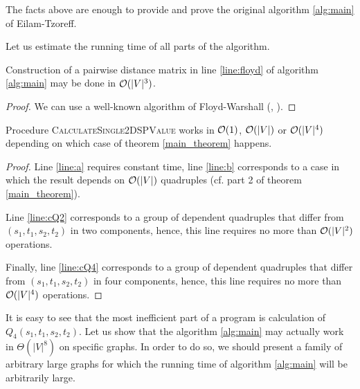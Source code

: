 The facts above are enough to provide and prove the original algorithm \ref{alg:main} of Eilam-Tzoreff.

Let us estimate the running time of all parts of the algorithm.

\begin{proposition}
Construction of a pairwise distance matrix in line \ref{line:floyd} of algorithm \ref{alg:main} may be done in $\mathcal{O}(|V|^3)$.
\end{proposition}
\begin{proof}
We can use a well-known algorithm of Floyd-Warshall (\cite{Floyd}, \cite{CLRS}).
\end{proof}

\begin{proposition}
Procedure \textsc{CalculateSingle2DSPValue} works in $\mathcal{O}(1)$, $\mathcal{O}(|V|)$ or $\mathcal{O}(|V|^4)$ depending on which case of theorem \ref{main_theorem} happens.
\end{proposition}
\begin{proof}
Line \ref{line:a} requires constant time, line \ref{line:b} corresponds to a case in which the result depends on $\mathcal{O}(|V|)$ quadruples (cf. part 2 of theorem \ref{main_theorem}). 

Line \ref{line:cQ2} corresponds to a group of dependent quadruples that differ from $(s_1, t_1, s_2, t_2)$ in two components, hence, this line requires no more than $\mathcal{O}(|V|^2)$ operations.

Finally, line \ref{line:cQ4} corresponds to a group of dependent quadruples that differ from $(s_1, t_1, s_2, t_2)$ in four components, hence, this line requires no more than $\mathcal{O}(|V|^4)$ operations. \end{proof}

It is easy to see that the most inefficient part of a program is calculation of $Q_4(s_1, t_1, s_2, t_2)$. Let us show that the algorithm \ref{alg:main} may actually work in $\Theta(|V|^8)$ on specific graphs. In order to do so, we should present a family of arbitrary large graphs for which the running time of algorithm \ref{alg:main} will be arbitrarily large. 

